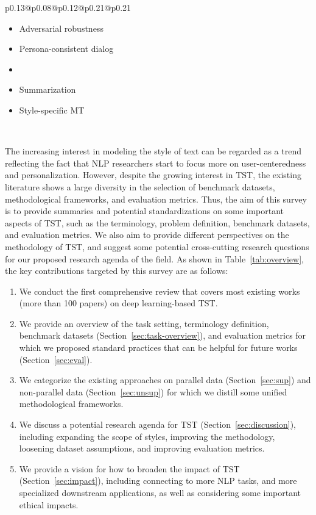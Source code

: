 \begin{table}[ht]
\begin{tabular*}{\columnwidth}{p{0.13\columnwidth}@{\extracolsep{\fill}}p{0.08\columnwidth}@{\extracolsep{\fill}}p{0.12\columnwidth}@{\extracolsep{\fill}}p{0.21\columnwidth}@{\extracolsep{\fill}}p{0.21\columnwidth}}
\begin{minipage}[t]{1.2\linewidth}
\begin{itemize}[nosep, wide=0pt, leftmargin=*, after=\strut]
        \item Adversarial robustness
        \item Persona-consistent dialog
        \item {}
        \item Summarization
        \item Style-specific MT
    \end{itemize}
    \endgroup
    \end{minipage}
    \\
    \bottomrule
\end{tabular*}
\end{table}

The increasing interest in modeling the style of text can be regarded as a trend reflecting the fact that NLP researchers start to focus more on user-centeredness and personalization. However, despite the growing interest in TST, the existing literature shows a large diversity in the selection of benchmark datasets, methodological frameworks, and evaluation metrics. Thus, the aim of this survey is to provide summaries and potential standardizations on some important aspects of TST, such as the terminology, problem definition, benchmark datasets, and evaluation metrics.
We also aim to provide different perspectives on the methodology of TST, and suggest some potential cross-cutting research questions for our proposed research agenda of the field.
As shown in Table~\ref{tab:overview}, the key contributions targeted by this survey are as follows:
\begin{enumerate}
    \item We conduct the first comprehensive review that covers most existing works (more than 100 papers) on deep learning-based TST.
    \item We provide an overview of the task setting, terminology definition, benchmark datasets (Section~\ref{sec:task-overview}), and evaluation metrics for which we proposed standard practices that can be helpful for future works (Section~\ref{sec:eval}).
    \item We categorize the existing approaches on parallel data (Section~\ref{sec:sup}) and non-parallel data (Section~\ref{sec:unsup}) for which we distill some unified methodological frameworks.
    \item We discuss a potential research agenda for TST (Section~\ref{sec:discussion}), including expanding the scope of styles, improving the methodology, loosening dataset assumptions, and improving evaluation metrics.
    \item We provide a vision for how to broaden the impact of TST (Section~\ref{sec:impact}), including connecting to more NLP tasks, and more specialized downstream applications, as well as considering some important ethical impacts.
\end{enumerate}

